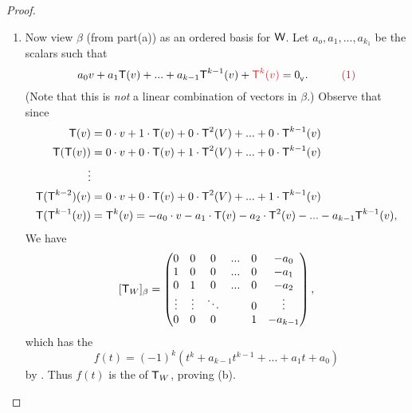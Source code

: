 \begin{proof}
\begin{enumerate}
\item Now view \(\beta\) (from part(a)) as an ordered basis for \(\textsf{W}\).
Let \(a_o, a_1, ..., a_{k_1}\) be the scalars such that
\[
    a_0 v + a_1 \T(v) + ... + a_{k - 1} \T^{k - 1} (v) + \RED{\T^k(v)} = \OV. \quad \quad \quad \MAROON{(1)}
\]
(Note that this is \emph{not} a linear combination of vectors in \(\beta\).)
Observe that since
\begin{align*}
    \textsf{T}(v) & = 0 \cdot v + 1 \cdot \textsf{T}(v) + 0 \cdot \textsf{T}^2(V) + ... + 0 \cdot \textsf{T}^{k - 1}(v) \\
    \textsf{T}(\textsf{T}(v)) & = 0 \cdot v + 0 \cdot \textsf{T}(v) + 1 \cdot \textsf{T}^2(V) + ... + 0 \cdot \textsf{T}^{k - 1}(v) \\
    \vdots \\
    \textsf{T}(\textsf{T}^{k - 2})(v) & = 0 \cdot v + 0 \cdot \textsf{T}(v) + 0 \cdot \textsf{T}^2(V) + ... + 1 \cdot \textsf{T}^{k - 1}(v) \\
    \textsf{T}(\textsf{T}^{k - 1}(v)) & = \textsf{T}^k(v) = -a_0 \cdot v -a_1 \cdot \textsf{T}(v) - a_2 \cdot \textsf{T}^2(v) - ... - a_{k - 1} \textsf{T}^{k - 1}(v),
\end{align*}
We have
\[
    [\textsf{T}_W]_{\beta} = \begin{pmatrix}
        0 & 0 & 0 & ... & 0 & -a_0 \\
        1 & 0 & 0 & ... & 0 & -a_1 \\
        0 & 1 & 0 & ... & 0 & -a_2 \\
        \vdots & \vdots & \ddots & & 0 & \vdots \\
        0 & 0 & 0 & & 1 & -a_{k - 1}
    \end{pmatrix},
\]
which has the \CPOLY{}
\[
    f(t) = (-1)^k (t^k + a_{k - 1} t^{k-1} + ... + a_1 t + a_0)
\]
by .
Thus \(f(t)\) is the \CPOLY{} of \(\textsf{T}_W\), proving (b).
\end{enumerate}
\end{proof}

